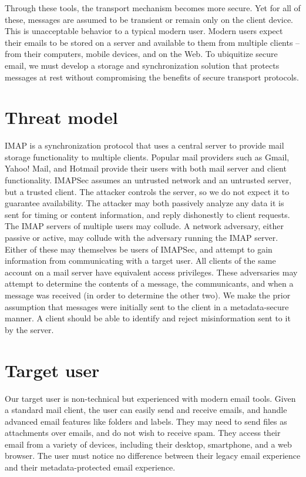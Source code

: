 \documentclass[pageno]{jpaper}
\newcommand{\project}{IMAPSec }
\newcommand{\projectnospace}{IMAPSec}
\begin{document}
Through these tools, the transport mechanism becomes more secure. Yet for all of these, messages are assumed to be transient or remain only on the client device. This is unacceptable behavior to a typical modern user. Modern users expect their emails to be stored on a server and available to them from multiple clients -- from their computers, mobile devices, and on the Web. To ubiquitize secure email, we must develop a storage and synchronization solution that protects messages at rest without compromising the benefits of secure transport protocols.


\section{Threat model}

IMAP is a synchronization protocol that uses a central server to provide mail storage functionality to multiple clients. Popular mail providers such as Gmail, Yahoo! Mail, and Hotmail provide their users with both mail server and client functionality. \project assumes an untrusted network and an untrusted server, but a trusted client. The attacker controls the server, so we do not expect it to guarantee availability. The attacker may both passively analyze any data it is sent for timing or content information, and reply dishonestly to client requests. The IMAP servers of multiple users may collude. A network adversary, either passive or active, may collude with the adversary running the IMAP server. Either of these may themselves be users of \projectnospace, and attempt to gain information from communicating with a target user. All clients of the same account on a mail server have equivalent access privileges. These adversaries may attempt to determine the contents of a message, the communicants, and when a message was received (in order to determine the other two). We make the prior assumption that messages were initially sent to the client in a metadata-secure manner. A client should be able to identify and reject misinformation sent to it by the server.


\section{Target user}
\label{targetuser}

Our target user is non-technical but experienced with modern email tools. Given a standard mail client, the user can easily send and receive emails, and handle advanced email features like folders and labels. They may need to send files as attachments over emails, and do not wish to receive spam. They access their email from a variety of devices, including their desktop, smartphone, and a web browser. The user must notice no difference between their legacy email experience and their metadata-protected email experience.
\end{document}
